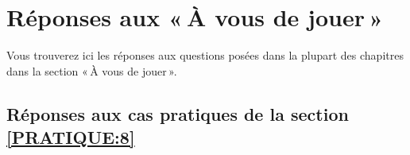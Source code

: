 

\chapter{Réponses aux « À vous de jouer »\label{annexe:reponses}}


Vous trouverez ici les réponses aux questions posées dans la plupart des chapitres dans la section « À vous de jouer ». 

\section{Réponses aux cas pratiques de la section \ref{PRATIQUE:8}\label{REPONSES:8}}
